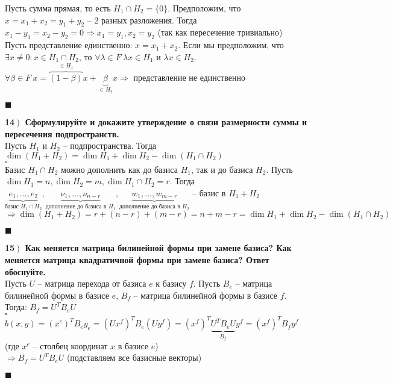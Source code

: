 \documentclass[a4paper,12pt]{article}
\begin{document}
\fbox{$\Rightarrow$} Пусть сумма прямая, то есть $H_1\cap H_2=\{0\}$. Предположим, что $x=x_1+x_2=y_1+y_2$ -- 2 разных разложения. Тогда $x_1-y_1=x_2-y_2=0\Rightarrow x_1=y_1, x_2=y_2$ (так как пересечение тривиально)\\
\fbox{$\Leftarrow$} Пусть представление единственно: $x=x_1+x_2$. Если мы предположим, что $\exists x\ne 0:x\in H_1\cap H_2$, то $\forall \lambda\in F\ \lambda x\in H_1$ и $\lambda x\in H_2$. $\forall \beta\in F\ x=\overbrace{(1-\beta)}^{\in H_1}x+\underbrace{\beta}_{\in H_2} x\Rightarrow$ представление не единственно
\begin{flushright}
	$\blacksquare$
\end{flushright}
\textbf{14$\left.\right)$ Сформулируйте и докажите утверждение о связи размерности суммы и пересечения подпространств.}\\
Пусть $H_1$ и $H_2$ -- подпространства. Тогда\\ $\dim(H_1+H_2)=\dim H_1+\dim H_2-\dim(H_1\cap H_2)$\\$\square$\\
Базис $H_1\cap H_2$ можно дополнить как до базиса $H_1$, так и до базиса $H_2$. Пусть $\dim H_1=n, \dim H_2=m, \dim H_1\cap H_2=r$. Тогда \\
$\underbrace{e_1, \ldots, e_2}_{\text{базис }H_1\cap H_2}, \underbrace{\nu_1, \ldots, \nu_{n-r}}_{\text{дополнение до базиса в } H_1}, \underbrace{w_1, \ldots, w_{m-r}}_{\text{дополнение до базиса в } H_2}$ -- базис в $H_1+H_2$\\
$\Rightarrow\dim(H_1+H_2)=r+(n-r)+(m-r)=n+m-r=\dim H_1+\dim H_2-\dim(H_1\cap H_2)$\\
\begin{flushright}
	$\blacksquare$
\end{flushright}
\textbf{15$\left.\right)$ Как меняется матрица билинейной формы при замене базиса? Как меняется матрица квадратичной формы при замене базиса? Ответ обоснуйте.}\\Пусть $U$ -- матрица перехода от базиса $e$ к базису $f$. Пусть $B_e$ -- матрица билинейной формы в базисе $e$, $B_f$ -- матрица билинейной формы в базисе $f$. Тогда: $B_f=U^TB_eU$\\
$\square$\\
$b(x, y)=(x^e)^TB_ey_e=(Ux^f)^TB_e(Uy^f)=(x^f)^T\underbrace{U^TB_eU}_{B_f}y^f=(x^f)^TB_fy^f$ (где $x^e$ -- столбец координат  $x$  в базисе $e$)\\
$\Rightarrow B_f=U^TB_eU$ (подставляем все базисные векторы)
\begin{flushright}
	$\blacksquare$
\end{flushright}	
\end{document}
